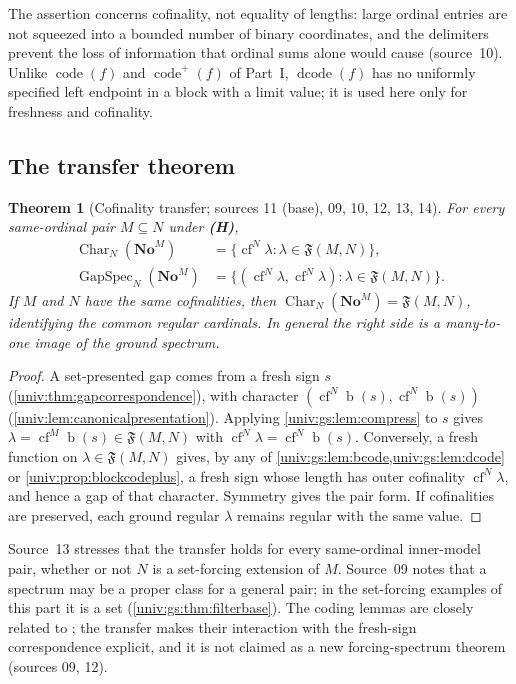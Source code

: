 \documentclass[11pt,letterpaper]{article}
\numberwithin{equation}{section}
\newtheorem{theorem}{Theorem}[section]
\theoremstyle{definition}
\theoremstyle{remark}
\newcommand{\No}{\mathbf{No}}
\newcommand{\NoM}{\No^{M}}
\newcommand{\bd}{\operatorname{b}}
\newcommand{\cf}{\operatorname{cf}}
\newcommand{\GapSpec}{\operatorname{GapSpec}}
\newcommand{\code}{\operatorname{code}}
\newcommand{\codeplus}{\operatorname{code}^{+}}
\newcommand{\Char}{\operatorname{Char}}
\newcommand{\FF}{\mathfrak F}
\newcommand{\dcode}{\operatorname{dcode}}
\begin{document}
The assertion concerns cofinality, not equality of lengths: large ordinal entries
are not squeezed into a bounded number of binary coordinates, and the delimiters
prevent the loss of information that ordinal sums alone would cause
(source~10). Unlike $\code(f)$ and $\codeplus(f)$ of Part~I, $\dcode(f)$ has no
uniformly specified left endpoint in a block with a limit value; it is used here
only for freshness and cofinality.

\subsection{The transfer theorem}

\begin{theorem}[Cofinality transfer; sources 11 (base), 09, 10, 12, 13, 14]\label{univ:gs:thm:transfer}
For every same-ordinal pair $M\subseteq N$ under \textbf{(H)},
\begin{align}
 \Char_N(\NoM)&=\{\cf^N\lambda:\lambda\in\FF(M,N)\},\label{univ:gs:eq:transfer}\\
 \GapSpec_N(\NoM)&=\{(\cf^N\lambda,\cf^N\lambda):\lambda\in\FF(M,N)\}.\label{univ:gs:eq:pairtransfer}
\end{align}
If $M$ and $N$ have the same cofinalities, then $\Char_N(\NoM)=\FF(M,N)$,
identifying the common regular cardinals. In general the right side is a
many-to-one image of the ground spectrum.
\end{theorem}
\begin{proof}
A set-presented gap comes from a fresh sign $s$ (\cref{univ:thm:gapcorrespondence}),
with character $(\cf^N\bd(s),\cf^N\bd(s))$ (\cref{univ:lem:canonicalpresentation}).
Applying \cref{univ:gs:lem:compress} to $s$ gives $\lambda=\cf^M\bd(s)\in\FF(M,N)$
with $\cf^N\lambda=\cf^N\bd(s)$. Conversely, a fresh function on
$\lambda\in\FF(M,N)$ gives, by any of
\cref{univ:gs:lem:bcode,univ:gs:lem:dcode} or \cref{univ:prop:blockcodeplus}, a
fresh sign whose length has outer cofinality $\cf^N\lambda$, and hence a gap of
that character. Symmetry gives the pair form. If cofinalities are preserved, each
ground regular $\lambda$ remains regular with the same value.
\end{proof}

Source~13 stresses that the transfer holds for every same-ordinal inner-model
pair, whether or not $N$ is a set-forcing extension of $M$. Source~09 notes that a
spectrum may be a proper class for a general pair; in the set-forcing examples of
this part it is a set (\cref{univ:gs:thm:filterbase}). The coding lemmas are
closely related to \cite[Propositions~5.2--5.3]{FKW}; the transfer makes their
interaction with the fresh-sign correspondence explicit, and it is not claimed as
a new forcing-spectrum theorem (sources 09, 12).
\end{document}
